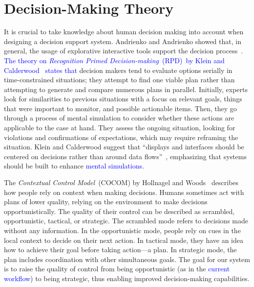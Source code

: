 \documentclass{egpubl}
\newcommand{\diff}[1]{\textcolor{blue}{#1}}
\begin{document}

\section{Decision-Making Theory} \label{sec:theory}
It is crucial to take knowledge about human decision making into account when designing a decision support system. Andrienko and Andrienko showed that, in general, the usage of explorative interactive tools support the decision process~\cite{Andrienko:2003kv}. \diff{The theory on \emph{Recognition Primed Decision-making}~(RPD)~by Klein and Calderwood~\cite{KleinCalderwood} states that} decision makers tend to evaluate options serially in time-constrained situations; they attempt to find one viable plan rather than attempting to generate and compare numerous plans in parallel. Initially, experts look for similarities to previous situations with a focus on relevant goals, things that were important to monitor, and possible actionable items. Then, they go through a process of mental simulation to consider whether these actions are applicable to the case at hand. They assess the ongoing situation, looking for violations and confirmations of expectations, which may require reframing the situation. Klein and Calderwood suggest that ``displays and interfaces should be centered on decisions rather than around data flows''~\cite{KleinCalderwood}, emphasizing that systems should be built to enhance \diff{mental simulations}. 

The \emph{Contextual Control Model}~(COCOM) by Hollnagel and Woods~\cite{hollnagel2005joint} describes how people rely on context when making decisions. Humans sometimes act with plans of lower quality, relying on the environment to make decisions opportunistically. The quality of their control can be described as scrambled, opportunistic, tactical, or strategic. The scrambled mode refers to decisions made without any information. In the opportunistic mode, people rely on cues in the local context to decide on their next action. In tactical mode, they have an idea how to achieve their goal before taking action---a plan. In strategic mode, the plan includes coordination with other simultaneous goals. The goal for our system is to raise the quality of control from being opportunistic (as in the \diff{current workflow}) to being strategic, thus enabling improved decision-making capabilities.
\end{document}

